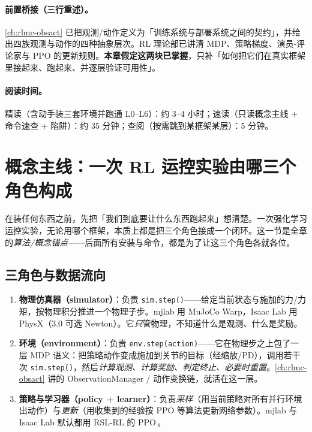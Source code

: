 \paragraph{前置桥接（三行重述）。}\cref{ch:rlmc-obsact} 已把观测/动作定义为「训练系统与部署系统之间的契约」，并给出四族观测与动作的四种抽象层次。RL 理论部已讲清 MDP、策略梯度、演员-评论家与 PPO 的更新规则。\textbf{本章假定这两块已掌握}，只补「如何把它们在真实框架里接起来、跑起来、并逐层验证可用性」。

\paragraph{阅读时间。}精读（含动手装三套环境并跑通 L0--L6）：约 3--4 小时；速读（只读概念主线 + 命令速查 + 陷阱）：约 35 分钟；查阅（按需跳到某框架某层）：5 分钟。

\section{概念主线：一次 RL 运控实验由哪三个角色构成}
\label{sec:rlmc-setup-loop}

在装任何东西之前，先把「我们到底要让什么东西跑起来」想清楚。一次强化学习运控实验，无论用哪个框架，本质上都是把三个角色接成一个闭环。这一节是全章的\emph{算法/概念锚点}——后面所有安装与命令，都是为了让这三个角色各就各位。

\subsection{三角色与数据流向}

\begin{enumerate}
  \item \textbf{物理仿真器（simulator）}：负责 \verb|sim.step()|——给定当前状态与施加的力/力矩，按物理积分推进一个物理子步。mjlab 用 MuJoCo Warp，Isaac Lab 用 PhysX（3.0 可选 Newton）。它\emph{只}管物理，不知道什么是观测、什么是奖励。
  \item \textbf{环境（environment）}：负责 \verb|env.step(action)|——它在物理步之上包了一层 MDP 语义：把策略动作变成施加到关节的目标（经缩放/PD），调用若干次 \verb|sim.step()|，然后\emph{计算观测、计算奖励、判定终止、必要时重置}。\cref{ch:rlmc-obsact} 讲的 ObservationManager / 动作变换链，就活在这一层。
  \item \textbf{策略与学习器（policy + learner）}：负责\emph{采样}（用当前策略对所有并行环境出动作）与\emph{更新}（用收集到的经验按 PPO 等算法更新网络参数）。mjlab 与 Isaac Lab 默认都用 RSL-RL 的 PPO\,\cite{schwarke2025rslrl}。
\end{enumerate}


